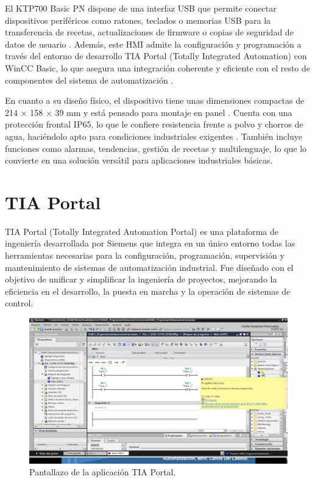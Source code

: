 El KTP700 Basic PN dispone de una interfaz USB que permite conectar dispositivos periféricos como ratones, teclados o memorias USB para la transferencia de recetas, actualizaciones de firmware o copias de seguridad de datos de usuario \cite{HMI_KTP}. Además, este HMI admite la configuración y programación a través del entorno de desarrollo TIA Portal (Totally Integrated Automation) con WinCC Basic, lo que asegura una integración coherente y eficiente con el resto de componentes del sistema de automatización \cite{HMI_KTP}.

En cuanto a su diseño físico, el dispositivo tiene unas dimensiones compactas de 214 × 158 × 39 mm y está pensado para montaje en panel \cite{HMI_KTP}. Cuenta con una protección frontal IP65, lo que le confiere resistencia frente a polvo y chorros de agua, haciéndolo apto para condiciones industriales exigentes \cite{HMI_KTP}. También incluye funciones como alarmas, tendencias, gestión de recetas y multilenguaje, lo que lo convierte en una solución versátil para aplicaciones industriales básicas.

\section{TIA Portal}

TIA Portal (Totally Integrated Automation Portal) es una plataforma de ingeniería desarrollada por Siemens que integra en un único entorno todas las herramientas necesarias para la configuración, programación, supervisión y mantenimiento de sistemas de automatización industrial. Fue diseñado con el objetivo de unificar y simplificar la ingeniería de proyectos, mejorando la eficiencia en el desarrollo, la puesta en marcha y la operación de sistemas de control.

\begin{figure} [h!]
  \begin{center}
    \includegraphics[width=14cm]{figs/TIA_portal}
  \end{center}
  \caption{\centering Pantallazo de la aplicación TIA Portal.}
  \label{fig:TIA_portal}
\end{figure} 

